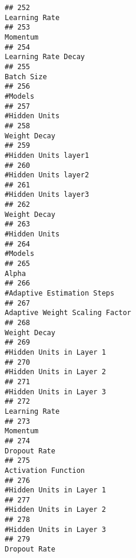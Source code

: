 \documentclass[
]{article}
\begin{document}
\begin{verbatim}
## 252                                                                           Learning Rate
## 253                                                                                Momentum
## 254                                                                     Learning Rate Decay
## 255                                                                              Batch Size
## 256                                                                                 #Models
## 257                                                                           #Hidden Units
## 258                                                                            Weight Decay
## 259                                                                    #Hidden Units layer1
## 260                                                                    #Hidden Units layer2
## 261                                                                    #Hidden Units layer3
## 262                                                                            Weight Decay
## 263                                                                           #Hidden Units
## 264                                                                                 #Models
## 265                                                                                   Alpha
## 266                                                              #Adaptive Estimation Steps
## 267                                                          Adaptive Weight Scaling Factor
## 268                                                                            Weight Decay
## 269                                                                #Hidden Units in Layer 1
## 270                                                                #Hidden Units in Layer 2
## 271                                                                #Hidden Units in Layer 3
## 272                                                                           Learning Rate
## 273                                                                                Momentum
## 274                                                                            Dropout Rate
## 275                                                                     Activation Function
## 276                                                                #Hidden Units in Layer 1
## 277                                                                #Hidden Units in Layer 2
## 278                                                                #Hidden Units in Layer 3
## 279                                                                            Dropout Rate

\end{verbatim}
\end{document}
